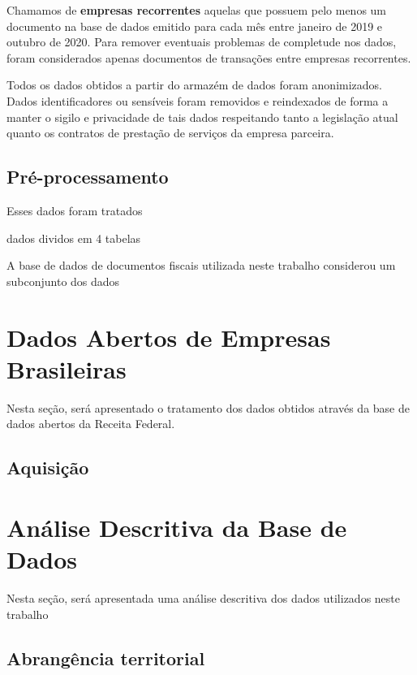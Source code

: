 Chamamos de \textbf{empresas recorrentes} aquelas que possuem pelo menos um documento na base de dados emitido para cada mês entre janeiro de 2019 e outubro de 2020. Para remover eventuais problemas de completude nos dados, foram considerados apenas documentos de transações entre empresas recorrentes.

Todos os dados obtidos a partir do armazém de dados foram anonimizados. Dados identificadores ou sensíveis foram removidos e reindexados de forma a manter o sigilo e privacidade de tais dados respeitando tanto a legislação atual quanto os contratos de prestação de serviços da empresa parceira.

\subsection{Pré-processamento}

Esses dados foram tratados

dados dividos em 4 tabelas

A base de dados de documentos fiscais utilizada neste trabalho considerou um subconjunto dos dados 

\section{Dados Abertos de Empresas Brasileiras}

Nesta seção, será apresentado o tratamento dos dados obtidos através da base de dados abertos da Receita Federal.

\subsection{Aquisição}


\section{Análise Descritiva da Base de Dados}

Nesta seção, será apresentada uma análise descritiva dos dados utilizados neste trabalho

\subsection{Abrangência territorial}

